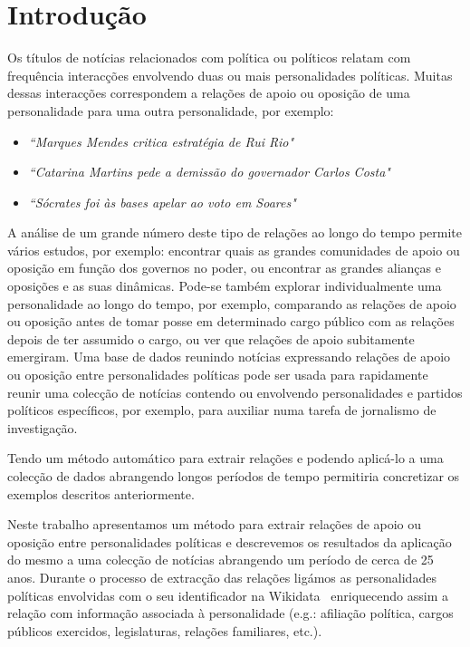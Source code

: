 \documentclass[a4paper, twocolumn, 11pt, twoside]{article}
\begin{document}
\section{Introdução}
\label{sec:intro}

Os títulos de notícias relacionados com política ou políticos relatam com frequência interacções envolvendo duas ou mais personalidades políticas. Muitas dessas interacções correspondem a relações de apoio ou oposição de uma personalidade para uma outra personalidade, por exemplo:

\begin{itemize}
\item{\textit{``Marques Mendes critica estratégia de Rui Rio"}}
\item{\textit{``Catarina Martins pede a demissão do governador Carlos Costa"}}
\item{\textit{``Sócrates foi às bases apelar ao voto em Soares"}}
\end{itemize}

A análise de um grande número deste tipo de relações ao longo do tempo permite vários estudos, por exemplo: encontrar quais as grandes comunidades de apoio ou oposição em função dos governos no poder, ou encontrar as grandes alianças e oposições e as suas dinâmicas. Pode-se também explorar individualmente uma personalidade ao longo do tempo, por exemplo, comparando as relações de apoio ou oposição antes de tomar posse em determinado cargo público com as relações depois de ter assumido o cargo, ou ver que relações de apoio subitamente emergiram. Uma base de dados reunindo notícias expressando relações de apoio ou oposição entre personalidades políticas pode ser usada para rapidamente reunir uma colecção de notícias contendo ou envolvendo personalidades e partidos políticos específicos, por exemplo, para auxiliar numa tarefa de jornalismo de investigação. 

Tendo um método automático para extrair relações e podendo aplicá-lo a uma colecção de dados abrangendo longos períodos de tempo permitiria concretizar os exemplos descritos anteriormente.

Neste trabalho apresentamos um método para extrair relações de apoio ou oposição entre personalidades políticas e descrevemos os resultados da aplicação do mesmo a uma colecção de notícias abrangendo um período de cerca de 25 anos. Durante o processo de extracção das relações ligámos as personalidades políticas envolvidas com o seu identificador na Wikidata~\citep{MKGGB2018} enriquecendo assim a relação com informação associada à personalidade (e.g.: afiliação política, cargos públicos exercidos, legislaturas, relações familiares, etc.). 
\end{document}
